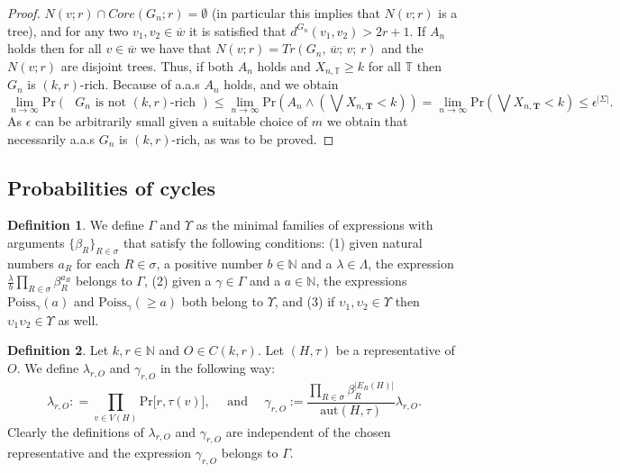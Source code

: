 \documentclass[12pt,notitlepage,a4paper]{article}
\theoremstyle{definition}
\newtheorem{definition}{Definition}[section]
\newcommand{\N}{\mathbb{N}}
\newcommand{\Ln}{\lim\limits_{n\to \infty}}
\newcommand{\aut}{\mathrm{aut}}
\begin{document}
\begin{proof}
	$N(v;r)\cap Core(G_n;r)=\emptyset$ 
	(in particular this implies that $N(v;r)$ is a tree),
	and for any two $v_1,v_2\in \overline{w}$
	it is satisfied that	
	$d^{G_n}(v_1,v_2)>2r+1$.
	If $A_n$ holds then	for all	$v\in \overline{w}$ we have that
	$N(v;r)=Tr(G_n,\,\overline{w};\,v;\,r)$ and
	the $N(v;r)$ are disjoint trees. 
	Thus, if both $A_n$ holds and $X_{n,\mathbb{T}}\geq k$ for all $\mathbb{T}$ then 
	$G_n$ is $(k,r)$-rich. Because of  a.a.s $A_n$ holds, and we
	obtain
	\[
	\Ln \mathrm{Pr}\left(
	\text{ $G_n$ is not
	$(k,r)$-rich }	
	\right) \leq 
	\Ln \mathrm{Pr}\left(
	A_n \wedge \left(
	\bigvee X_{n,\mathbf{T}}<k
	\right)
	\right) =
	\Ln \mathrm{Pr}\left(
	\bigvee X_{n,\mathbf{T}}<k
	\right)	
	\leq \epsilon^{|\Sigma|}.
	\]
	As $\epsilon$ can be arbitrarily small given a suitable choice of $m$ we
	obtain that necessarily a.a.s $G_n$ is $(k,r)$-rich, as was to be proved. 
\end{proof}
		
\subsection{Probabilities of cycles}
	
\begin{definition}
	We define $\Gamma$ and $\Upsilon$ as the minimal families of expressions with arguments
	$\{\beta_R\}_{R\in \sigma}$ that satisfy the following conditions:
	(1) given natural numbers $a_R$ for each $R\in \sigma$, a positive number $b\in \N$
	and a $\lambda\in \Lambda$, the expression $\frac{\lambda}{b}  \prod_{R\in \sigma} \beta_R^{a_R}$
	belongs to $\Gamma$, 
	(2) given a $\gamma\in \Gamma$ and a $a\in \N$, the expressions $\mathrm{Poiss}_\gamma(a)$
	and $\mathrm{Poiss}_{\gamma}(\geq a)$ both belong to $\Upsilon$, and
	(3) if $\upsilon_1, \upsilon_2\in \Upsilon$ then 
	$\upsilon_1  \upsilon_2 \in \Upsilon$ as well. 
\end{definition}

\begin{definition} Let $k,r\in \N$ and $O\in C(k,r)$.
	Let $(H,\tau)$ be
	a representative of $O$.
	We define $\lambda_{r,O}$ and 
	$\gamma_{r,O}$ in the following way:
	\[ 
	\lambda_{r,O}:
	=\prod_{v\in V(H)}
	\mathrm{Pr} \big[ r, \tau(v) \big],
	\quad 
	\text{ and } \quad
	\gamma_{r,O}:=
	\frac{\prod_{R\in \sigma} \beta_R^{|E_R(H)|}}
	{\aut(H,\tau)} \lambda_{r,O}.
	\]	
	Clearly the definitions of $\lambda_{r,O}$ and $\gamma_{r,O}$
	are independent of the chosen representative and
	the expression $\gamma_{r,O}$ belongs to $\Gamma$.
\end{definition}
\end{document}
